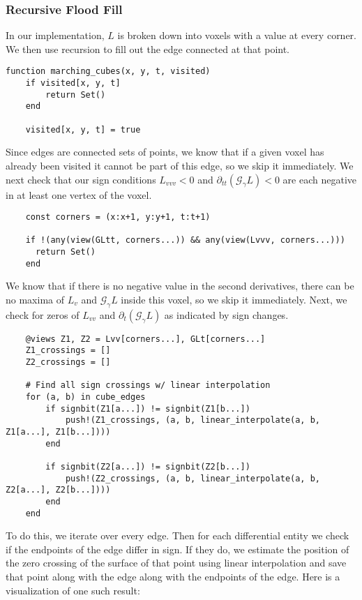 \documentclass{article}
\begin{document}
\subsubsection{Recursive Flood Fill}
In our implementation, $L$ is broken down into voxels with a value at every corner.
We then use recursion to fill out the edge connected at that point.
\begin{lstlisting}
function marching_cubes(x, y, t, visited)
    if visited[x, y, t]
        return Set()
    end

    visited[x, y, t] = true
\end{lstlisting}
Since edges are connected sets of points, we know that if a given voxel has already been visited it cannot be part of this edge, so we skip it immediately.
We next check that our sign conditions $L_{vvv} < 0$ and $\partial_{tt}(\mathcal G_\gamma L) < 0$ are each negative in at least one vertex of the voxel.
\begin{lstlisting}
    const corners = (x:x+1, y:y+1, t:t+1)

    if !(any(view(GLtt, corners...)) && any(view(Lvvv, corners...)))
      return Set()
    end
\end{lstlisting}
We know that if there is no negative value in the second derivatives, there can be no maxima of $L_{v}$ and $\mathcal G_\gamma L$ inside this voxel, so we skip it immediately.
Next, we check for zeros of $L_{vv}$ and $\partial_{t} (\mathcal G_\gamma L)$ as indicated by sign changes.
\begin{lstlisting}
    @views Z1, Z2 = Lvv[corners...], GLt[corners...]
    Z1_crossings = []
    Z2_crossings = []

    # Find all sign crossings w/ linear interpolation
    for (a, b) in cube_edges
        if signbit(Z1[a...]) != signbit(Z1[b...])
            push!(Z1_crossings, (a, b, linear_interpolate(a, b, Z1[a...], Z1[b...])))
        end

        if signbit(Z2[a...]) != signbit(Z2[b...])
            push!(Z2_crossings, (a, b, linear_interpolate(a, b, Z2[a...], Z2[b...])))
        end
    end
\end{lstlisting}
To do this, we iterate over every edge.
Then for each differential entity we check if the endpoints of the edge differ in sign.
If they do, we estimate the position of the zero crossing of the surface of that point using linear interpolation and save that point along with the edge along with the endpoints of the edge.
Here is a visualization of one such result:
\end{document}
